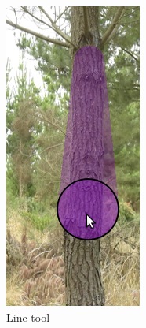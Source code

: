 \documentclass{article}
\begin{document}
\begin{figure}[h!]
\centering
\begin{subfigure}[t]{.3\textwidth}
  \centering
  \includegraphics[width=0.6\linewidth]{images/line_tool.png}
  \caption{Line tool}
\end{subfigure}%
\begin{subfigure}[t]{.3\textwidth}
  \centering

\end{subfigure}
\end{figure}
\end{document}
